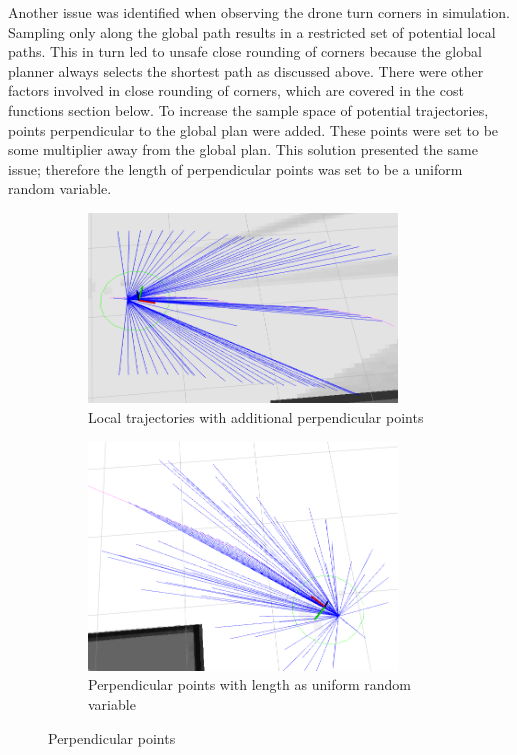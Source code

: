 \documentclass[capstone_report.tex]{subfiles}
\begin{document}
Another issue was identified when observing the drone turn corners in simulation.  Sampling only along the global path results in a restricted set of potential local paths.  This in turn led to unsafe close rounding of corners because the global planner always selects the shortest path as discussed above.  There were other factors involved in close rounding of corners, which are covered in the cost functions section below.  To increase the sample space of potential trajectories, points perpendicular to the global plan were added.  These points were set to be some multiplier away from the global plan.  This solution presented the same issue; therefore the length of perpendicular points was set to be a uniform random variable.

\begin{figure}[H]
    \centering
    \begin{subfigure}[b]{0.5\textwidth}
        \centering
        \includegraphics[width=0.9\textwidth]{imgs/local_traj_gen_perp.png}
        \caption{Local trajectories with additional perpendicular points}
    \end{subfigure}%
    \begin{subfigure}[b]{0.5\textwidth}
        \centering
        \includegraphics[width=0.9\textwidth]{imgs/local_traj_gen_random.png}
        \caption{Perpendicular points with length as uniform random variable}
    \end{subfigure}
    \caption{Perpendicular points\label{fig:local_traj_gen_perp}}
\end{figure}
\end{document}
